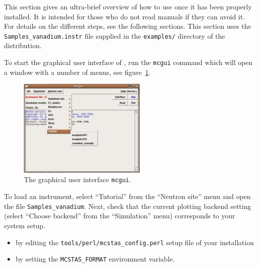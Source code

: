 This section gives an ultra-brief overview of how to use \MCS once it
has been properly installed. It is intended for those who do not read
manuals if they can avoid it. For details on the different steps, see
the following sections. This section uses the
\verb+Samples_vanadium.instr+ file supplied in the \verb+examples/+
directory of the \MCS distribution.

To start the graphical user interface of \MCS, run the
\verb+mcgui+ command which will open a window
with a number of menus,
see figure~\ref{fig:mcgui}. 
\begin{figure}[htb!]
  \begin{center}
    \includegraphics[width=0.55\textwidth]{figures/mcgui}
  \end{center}
\caption{The graphical user interface \texttt{mcgui}.}
\label{fig:mcgui}
\end{figure}
\label{p:neutronsite}
To load an instrument, select ``Tutorial'' from the ``Neutron site''
menu and open the file \verb+Samples_vanadium+. Next, check that the current plotting backend setting
(select ``Choose backend'' from the ``Simulation'' menu) corresponds
to your system setup.
\begin{itemize}
\item{by editing
the \verb+tools/perl/mcstas_config.perl+ setup file of your
installation}
\item{by setting the \verb+MCSTAS_FORMAT+ environment
variable.}
\end{itemize}

